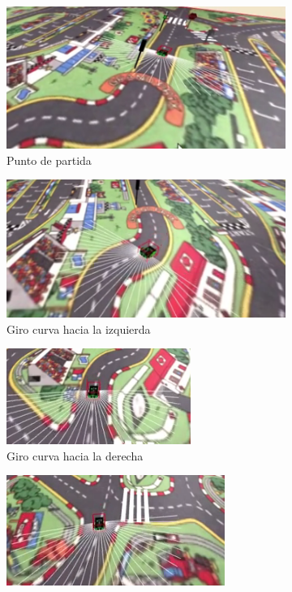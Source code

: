 \documentclass{report}
\begin{document}
\begin{figure}[h]
\begin{subfigure}{.5\textwidth}
  \centering
  \includegraphics[width=.7\linewidth]{images/cap4/1.png}  
  \caption{Punto de partida}
  \label{fig:sub-first}
\end{subfigure}
\begin{subfigure}{.5\textwidth}
  \centering
  \includegraphics[width=.7\linewidth]{images/cap4/2.png}  
  \caption{Giro curva hacia la izquierda}
  \label{fig:sub-second}
\end{subfigure}
\begin{subfigure}{.5\textwidth}
  \centering
  \includegraphics[width=.7\linewidth]{images/cap4/3.png}  
  \caption{Giro curva hacia la derecha}
  \label{fig:sub-third}
\end{subfigure}
\begin{subfigure}{.5\textwidth}
  \centering
  \includegraphics[width=.7\linewidth]{images/cap4/4.png}  

\end{subfigure}
\end{figure}
\end{document}
